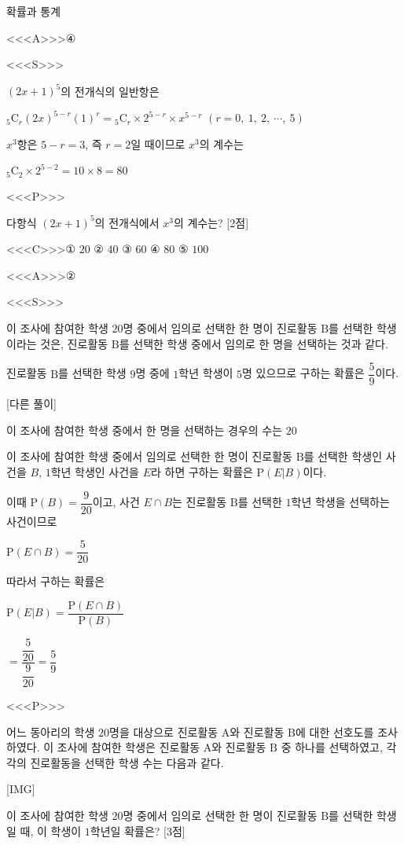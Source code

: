 \documentclass{oblivoir}
\begin{document}
확률과 통계

<<<A>>>④

<<<S>>>

$(2x+1)^{5}$의 전개식의 일반항은

${}_{5}\mathrm{C}_{r}(2x)^{5-r}(1)^{r}={}_{5}\mathrm{C}_{r}\times 2^{5-r}\times x^{5-r}$ $(r= 0,\:1,\:2,\:\cdots ,\:5)$

$x^{3}$항은 $5-r = 3$, 즉 $r=2$일 때이므로 $x^{3}$의 계수는

${}_{5}\mathrm{C}_{2}\times 2^{5-2}= 10\times 8 = 80$

<<<P>>>

다항식 $(2x+1)^{5}$의 전개식에서 $x^{3}$의 계수는? [2점]

<<<C>>>① $20$ ② $40$ ③ $60$ ④ $80$ ⑤ $100$

<<<A>>>②

<<<S>>>

이 조사에 참여한 학생 $20$명 중에서 임의로 선택한 한 명이 진로활동 $\mathrm{B}$를 선택한 학생이라는 것은, 진로활동 $\mathrm{B}$를 선택한 학생 중에서 임의로 한 명을 선택하는 것과 같다.

진로활동 $\mathrm{B}$를 선택한 학생 $9$명 중에 $1$학년 학생이 $5$명 있으므로 구하는 확률은 $\dfrac{5}{9}$이다.

[다른 풀이]

이 조사에 참여한 학생 중에서 한 명을 선택하는 경우의 수는 $20$

이 조사에 참여한 학생 중에서 임의로 선택한 한 명이 진로활동 $\mathrm{B}$를 선택한 학생인 사건을 $B$, $1$학년 학생인 사건을 $E$라 하면 구하는 확률은 $\mathrm{P}(E | B)$이다.

이때 $\mathrm{P}(B)=\dfrac{9}{20}$이고, 사건 $E\cap B$는 진로활동 $\mathrm{B}$를 선택한 $1$학년 학생을 선택하는 사건이므로

$\mathrm{P}(E\cap B)=\dfrac{5}{20}$

따라서 구하는 확률은

$\mathrm{P}(E | B)$$=\dfrac{\mathrm{P}(E\cap B)}{\mathrm{P}(B)}$

$=\dfrac{\dfrac{5}{20}}{\dfrac{9}{20}}=\dfrac{5}{9}$

<<<P>>>

어느 동아리의 학생 $20$명을 대상으로 진로활동 $\mathrm{A}$와 진로활동 $\mathrm{B}$에 대한 선호도를 조사하였다. 이 조사에 참여한 학생은 진로활동 $\mathrm{A}$와 진로활동 $\mathrm{B}$ 중 하나를 선택하였고, 각각의 진로활동을 선택한 학생 수는 다음과 같다.

[IMG]

이 조사에 참여한 학생 $20$명 중에서 임의로 선택한 한 명이 진로활동 $\mathrm{B}$를 선택한 학생일 때, 이 학생이 $1$학년일 확률은? [3점]
\end{document}
